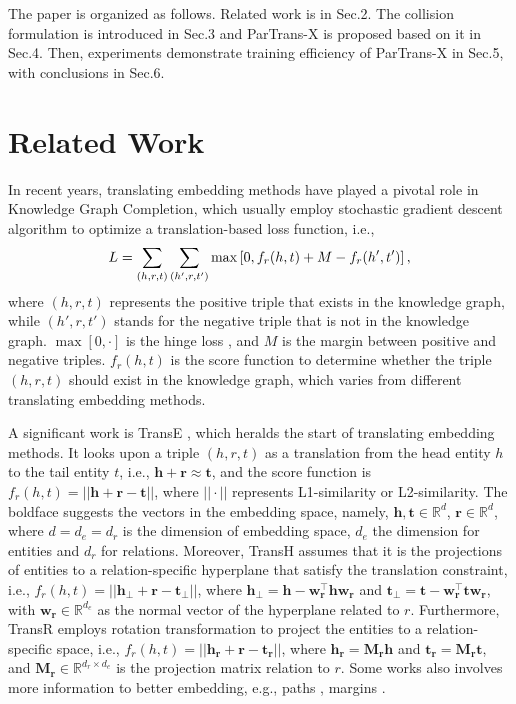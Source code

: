 \documentclass[sigconf]{acmart}
\begin{document}
The paper is organized as follows. Related work is in Sec.2. The collision formulation is introduced in Sec.3 and ParTrans-X is proposed based on it in Sec.4.
Then, experiments demonstrate training efficiency of ParTrans-X in Sec.5, with conclusions in Sec.6. 


\section{Related Work}
In recent years, translating embedding methods have played a pivotal role in Knowledge Graph Completion, which usually employ stochastic gradient descent algorithm to optimize a translation-based loss function, i.e., 
\begin{equation}\label{eqlossall}
\vspace{-4pt}
L=\sum_{(h,r,t)} \sum_{(h',r,t')} \max\left[0,f_r(h,t)+M-f_r(h',t')\right],
\vspace{-4pt}
\end{equation} 
where $(h,r,t)$ represents the positive triple that exists in the knowledge graph, while $(h',r,t')$ stands for the negative triple that is not in the knowledge graph. $\max \left[0,\cdot \right]$ is the hinge loss , and $M$ is the margin between positive and negative triples. $f_r(h,t)$ is the score function to determine whether the triple $(h,r,t)$ should exist in the knowledge graph, which varies from different translating embedding methods.


A significant work is TransE \cite{bordes2013translating}, which heralds the start of translating embedding methods. It looks upon a triple $(h,r,t)$ as a translation from the head entity $h$ to the tail entity $t$, i.e., $\mathbf{h}+\mathbf{r} \approx \mathbf{t}$, and the score function is $f_r(h,t)=||\mathbf{h}+\mathbf{r}-\mathbf{t}||$, where $||\cdot||$ represents L1-similarity or L2-similarity. The boldface suggests the vectors in the embedding space, namely, $\mathbf{h},\mathbf{t} \in \mathbb{R}^{d}$, $\mathbf{r} \in \mathbb{R}^{d}$, 
where $d=d_{e}=d_{r}$ is the dimension of embedding space, $d_{e}$ the dimension for entities and $d_{r}$ for relations. 
Moreover, TransH \cite{Wang2014Knowledge} assumes that it is the projections of entities to a relation-specific hyperplane that satisfy the translation constraint, i.e., $f_r(h,t)=||\mathbf{h_\bot}+\mathbf{r}-\mathbf{t_\bot}||$, where $\mathbf{h_\bot}=\mathbf{h}-\mathbf{w_r^{\top}hw_{r}}$ and   $\mathbf{t_\bot}=\mathbf{t}-\mathbf{w_r^{\top}tw_{r}}$, with $\mathbf{w_r} \in \mathbb{R}^{d_{e}}$ as the normal vector of the hyperplane related to $r$.
Furthermore, TransR \cite{Lin2015Learning} employs rotation transformation to project the entities to a relation-specific space, i.e., $f_r(h,t)=||\mathbf{h_r}+\mathbf{r}-\mathbf{t_r}||$, where $\mathbf{h_r}=\mathbf{M_{r}h}$ and $\mathbf{t_r}=\mathbf{M_{r}t}$, and $\mathbf{M_{r}} \in \mathbb{R}^{d_{r} \times d_{e}}$ is the projection matrix relation to $r$.
Some works also involves more information to better embedding, e.g., paths \cite{Lin2015Modeling},  margins \cite{jia2016locally}.
\end{document}
